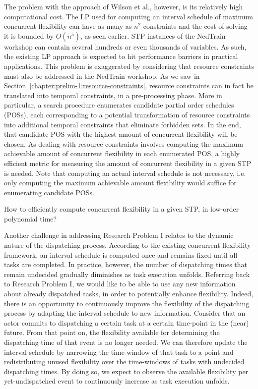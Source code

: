	The problem with the approach of Wilson et al., however, 
	is its relatively high computational cost. 
	The LP used for computing an interval schedule of maximum concurrent flexibility
	can have as many as $n^2$ constraints and the cost of solving it is bounded by $O(n^5)$, as seen earlier.
	STP instances of the NedTrain workshop can contain several hundreds or even thousands of variables.
	As such, the existing LP approach is expected to hit performance barriers in practical applications.
	This problem is exaggerated by considering that resource constraints must also be addressed in the NedTrain workshop.
	As we saw in Section~\ref{chapter:prelim-1:resource-constraints}, 
	resource constraints can in fact be translated into temporal constraints, in a pre-processing phase.
	More in particular, a search procedure enumerates candidate partial order schedules (POSs),
	each corresponding to a potential transformation of resource constraints into additional temporal constraints that eliminate forbidden sets. 
	In the end, that candidate POS with the highest amount of concurrent flexibility will be chosen. 
	As dealing with resource constraints involves computing the maximum achievable amount of concurrent flexibility in each enumerated POS,
	a highly efficient metric for measuring the amount of concurrent flexibility in a given STP is needed.
	Note that computing an actual interval schedule is not necessary,
	i.e. only computing the maximum achievable amount flexibility would suffice for enumerating candidate POSs.

	\begin{rquest}
	\label{rquest-1-1}
	
	How to efficiently compute concurrent flexibility in a given STP, in low-order polynomial time?
	\end{rquest}


	Another challenge in addressing Research Problem I relates to the dynamic nature of the dispatching process.
	According to the existing concurrent flexibility framework, 
	an interval schedule is computed once and remains fixed until all tasks are completed.
	In practice, however, the number of dispatching times that remain undecided gradually diminishes as task execution unfolds.
	Referring back to Research Problem I, we would like to be able to use any new information about already dispatched tasks, 
	in order to potentially enhance flexibility. 
	Indeed, there is an opportunity to continuously improve the flexibility of the dispatching process by adapting the interval schedule to new information. 
	Consider that an actor commits to dispatching a certain task at a certain time-point in the (near) future. 
	From that point on, the flexibility available for determining the dispatching time of that event is no longer needed. 
	We can therefore update the interval schedule by narrowing the time-window of that task to a point and 
	redistributing unused flexibility over the time-windows of tasks with undecided dispatching times. 
	By doing so, we expect to observe the available flexibility per yet-undispatched event to continuously increase as task execution unfolds.

